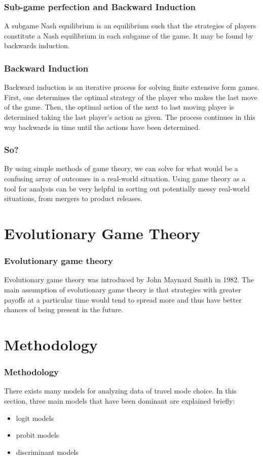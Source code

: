 \documentclass[aspectratio=169]{beamer}
\begin{document}
\begin{frame}
	\frametitle{Sub-game perfection and Backward Induction}
	A subgame Nash equilibrium is an equilibrium such that the strategies of players
constitute a Nash equilibrium in each subgame of the game. It may be found by \alert{backwards induction}.
\end{frame}
\begin{frame}
	\frametitle{Backward Induction}
Backward induction is an iterative process for solving finite extensive form games.
First, one determines the optimal strategy of the player who makes the last move of
the game. Then, the optimal action of the next to last moving player is determined
taking the last player’s action as given. The process continues in this way backwards
in time until the actions have been determined.
\end{frame}
\begin{frame}
\frametitle{So?}
By using simple methods of game theory, we can solve for what would be a confusing array of outcomes in a real-world situation. Using game theory as a tool for analysis can be very helpful in sorting out potentially messy real-world situations, from mergers to product releases.

\end{frame}

\section{Evolutionary Game Theory}

\begin{frame}
	\frametitle{Evolutionary game theory}
Evolutionary game theory was introduced by John Maynard Smith in 1982. The main assumption of evolutionary game theory is that strategies with greater payoffs at a particular time would tend to spread more and thus have better chances of being present in the future.
\end{frame}

\section{Methodology}

\begin{frame}
  \frametitle{Methodology}   %
	There exists many models for analyzing data of travel mode choice. In this section, three main models that have been dominant are explained briefly:
  \begin{itemize}
  \item logit models
  \item probit models
  \item discriminant models
  \end{itemize}
\end{frame}
\end{document}
